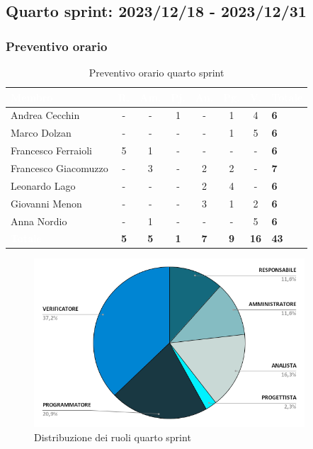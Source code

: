 \newpage
\subsection{Quarto sprint: 2023/12/18 - 2023/12/31}
\subsubsection{Preventivo orario}
{
\setlength{\tabcolsep}{10pt}
\renewcommand{\arraystretch}{1.5}
\begin{table}[h!]
    \centering
    \begin{tabularx}{\textwidth}{| l | c | c | c | c | c | c | X |}
        \hline
        \rowcolor{headerrow} \textbf{\textcolor{white}{Membro}} & \textbf{\textcolor{white}{R.}} & \textbf{\textcolor{white}{Am.}} & \textbf{\textcolor{white}{Pj.}} & \textbf{\textcolor{white}{An.}} & \textbf{\textcolor{white}{Pg.}} & \textbf{\textcolor{white}{V.}} & \textbf{\textcolor{white}{Totale}} \\
        \hline
        Andrea Cecchin & - & - & 1 & - & 1 & 4 & \textbf{6} \\
        \hline
        Marco Dolzan & - & - & - & - & 1 & 5 & \textbf{6} \\
        \hline
        Francesco Ferraioli & 5 & 1 & - & - & - & - & \textbf{6} \\
        \hline  
        Francesco Giacomuzzo & - & 3 & - & 2 & 2 & - & \textbf{7} \\
        \hline
        Leonardo Lago & - & - & - & 2 & 4 & - & \textbf{6} \\
        \hline
        Giovanni Menon & - & - & - & 3 & 1 & 2 & \textbf{6} \\
        \hline
        Anna Nordio & - & 1 & - & - & - & 5 & \textbf{6} \\
        \hline
    \cellcolor{headerrow} \textbf{\textcolor{white}{Totale}} & \textbf{5} & \textbf{5} & \textbf{1} & \textbf{7} & \textbf{9} & \textbf{16} & \textbf{43} \\
        \hline
    \end{tabularx} 
    \caption{Preventivo orario quarto sprint}
    \label{tab:preventivoorarioquartosprint}
\end{table}
}

\begin{figure}[h!]
    \centering
    \includegraphics[width=0.9\textwidth]{prev4ruoli.png}
    \caption{Distribuzione dei ruoli quarto sprint}
    \label{fig:preventivoorarioquartosprint}
\end{figure}

